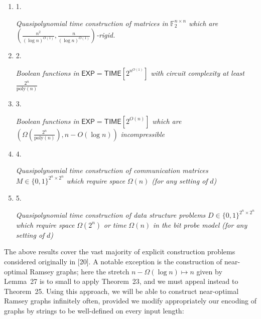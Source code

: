 \begin{enumerate}


\item[] 
1. 


\emph{Quasipolynomial time construction of matrices in }$\mathbb{F}_{2}^{n\times n}$\emph{ which are }$(\frac{n^{2}}{(\log n)^{O(1)}},\frac{n}{(\log n)^{O(1)}})$\emph{-rigid.}\par





\item[] 
2. 


\emph{Boolean functions in }$\mathsf{EXP}={\mathsf{TIME}}[2^{n^{O(1)}}]$\emph{ with circuit complexity at least }$\frac{2^{n}}{\mathrm{poly}(n)}$\emph{}\par





\item[] 
3. 


\emph{Boolean functions in }$\mathsf{EXP}={\mathsf{TIME}}[2^{O(n)}]$\emph{ which are }${(\Omega(\frac{2^{n}}{\mathrm{poly}(n)}),n-O(\log n))}$\emph{ incompressible}\par





\item[] 
4. 


\emph{Quasipolynomial time construction of communication matrices }$M\in\{0,1\}^{2^{n}\times 2^{n}}$\emph{ which require space }$\Omega(n)$\emph{ (for any setting of }$d$\emph{)}\par





\item[] 
5. 


\emph{Quasipolynomial time construction of data structure problems }$D\in\{0,1\}^{2^{n}\times 2^{n}}$\emph{ which require space }$\Omega(2^{n})$\emph{ or time }$\Omega(n)$\emph{ in the bit probe model (for any setting of }$d$\emph{)}\par





\end{enumerate}






The above results cover the vast majority of explicit construction problems considered originally in [20]. A notable exception is the construction of near-optimal Ramsey graphs; here the stretch $n-\Omega(\log n)\mapsto n$ given by Lemma 27 is to small to apply Theorem 23, and we must appeal instead to Theorem 25. Using this approach, we will be able to construct near-optimal Ramsey graphs infinitely often, provided we modify appropriately our encoding of graphs by strings to be well-defined on every input length:\par



